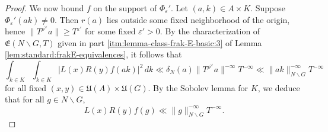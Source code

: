 \documentclass[reqno]{amsart}
\def\eps{\varepsilon}
\theoremstyle{plain} \newtheorem{theorem} {Theorem}
\theoremstyle{definition} \newtheorem{definition} [theorem] {Definition}
\theoremstyle{itplain} %
\numberwithin{equation}{section}
\numberwithin{theorem}{section}
\renewcommand{\geq}{\geqslant}
\begin{document}
\begin{proof}
  We now bound $f$ on the support of $\Phi_\eps '$.  Let $(a,k) \in A \times K$.  Suppose $\Phi_{\eps}'(a k) \neq 0$.  Then $r(a)$ lies outside some fixed neighborhood of the origin, hence $\|T^{\rho^\vee} a\| \geq T^{\eps '}$ for some fixed $\eps ' > 0$.  By the characterization of $\mathfrak{E}(N \backslash G, T)$ given in part \eqref{itm:lemma-class-frak-E-basic:3} of Lemma \ref{lem:standard:frakE-equivalences}, it follows that
  \begin{equation*}
    \int _{k \in K}
    \int _{k \in K}
    \left\lvert
      L(x) R(y) f(a k)
    \right\rvert^2 \, d k
    \ll
    \delta_N(a)
    \|T^{\rho^\vee} a\|^{-\infty}
    T^{-\infty}
    \ll \|a k\|_{N \backslash G}^{-\infty} T^{-\infty}
  \end{equation*}
  for all fixed $(x,y) \in \mathfrak{U}(A) \times \mathfrak{U}(G)$.  By the Sobolev lemma for $K$, we deduce that for all $g \in N \backslash G$,
  \begin{equation}\label{eq:lx-ry-fg}
    L(x) R(y) f(g) \ll \|g\|_{N \backslash G}^{-\infty} T^{-\infty}.
  \end{equation}


\end{proof}
\end{document}
